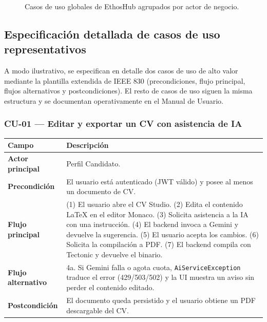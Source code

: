 \begin{figure}[h!]
\caption{Casos de uso globales de EthosHub agrupados por actor de negocio.}
\label{fig:casos-uso}
\end{figure}

\subsection{Especificación detallada de casos de uso representativos}
\label{subsec:cu_detallados}

A modo ilustrativo, se especifican en detalle dos casos de uso de alto valor mediante
la plantilla extendida de IEEE 830 (precondiciones, flujo principal, flujos
alternativos y postcondiciones). El resto de casos de uso siguen la misma estructura y
se documentan operativamente en el Manual de Usuario.

\clearpage
\subsubsection*{CU-01 — Editar y exportar un CV con asistencia de IA}
\noindent
\renewcommand{\arraystretch}{1.35}
\fontsize{9}{10.8}\selectfont\sffamily
\begin{tabularx}{\textwidth}{|>{\bfseries\color{colorPrimario}}L{3.2cm}|Y|}
\hline
{}
\textbf{Campo} & \textbf{Descripción} \\
\hline
Actor principal & Perfil Candidato. \\
\hline
{}
Precondición & El usuario está autenticado (JWT válido) y posee al menos un documento de CV. \\
\hline
Flujo principal & (1) El usuario abre el CV Studio. (2) Edita el contenido LaTeX en el editor Monaco. (3) Solicita asistencia a la IA con una instrucción. (4) El backend invoca a Gemini y devuelve la sugerencia. (5) El usuario acepta los cambios. (6) Solicita la compilación a PDF. (7) El backend compila con Tectonic y devuelve el binario. \\
\hline
{}
Flujo alternativo & 4a. Si Gemini falla o agota cuota, \texttt{AiServiceException} traduce el error (429/503/502) y la UI muestra un aviso sin perder el contenido editado. \\
\hline
Postcondición & El documento queda persistido y el usuario obtiene un PDF descargable del CV. \\
\hline
\end{tabularx}

